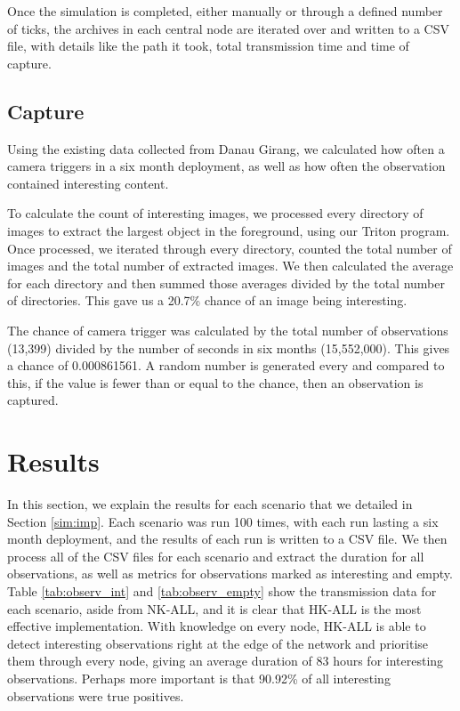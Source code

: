 	Once the simulation is completed, either manually or through a defined number of ticks, the archives in each central node are iterated over and written to a CSV file, with details like the path it took, total transmission time and time of capture.
	
\subsection{Capture}
	Using the existing data collected from Danau Girang, we calculated how often a camera triggers in a six month deployment, as well as how often the observation contained interesting content. 
	
	To calculate the count of interesting images, we processed every directory of images to extract the largest object in the foreground, using our Triton program. Once processed, we iterated through every directory, counted the total number of images and the total number of extracted images. We then calculated the average for each directory and then summed those averages divided by the total number of directories. This gave us a 20.7\% chance of an image being interesting.
	
	The chance of camera trigger was calculated by the total number of observations (13,399) divided by the number of seconds in six months (15,552,000). This gives a chance of 0.000861561. A random number is generated every and compared to this, if the value is fewer than or equal to the chance, then an observation is captured.

\section{Results}

	In this section, we explain the results for each scenario that we detailed in Section \ref{sim:imp}. Each scenario was run 100 times, with each run lasting a six month deployment, and the results of each run is written to a CSV file. We then process all of the CSV files for each scenario and extract the duration for all observations, as well as metrics for observations marked as interesting and empty. Table \ref{tab:observ_int} and \ref{tab:observ_empty} show the transmission data for each scenario, aside from NK-ALL, and it is clear that HK-ALL is the most effective implementation. With knowledge on every node, HK-ALL is able to detect interesting observations right at the edge of the network and prioritise them through every node, giving an average duration of 83 hours for interesting observations. Perhaps more important is that 90.92\% of all interesting observations were true positives.

